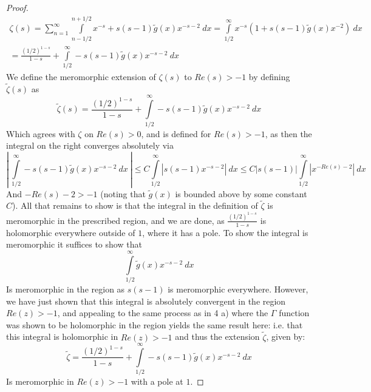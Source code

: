 \documentclass{article}
\begin{document}
\begin{proof}
    \begin{align*}
      \zeta(s) = \sum_{n=1}^{\infty}\int\limits_{n-1/2}^{n+1/2}x^{-s}+ s(s-1)\widetilde g(x) x^{-s-2} \ dx = \int\limits_{1/2}^{\infty}x^{-s}(1 + s(s-1)\widetilde g(x)x^{-2}) \ dx \\
      =  \frac{(1/2)^{1-s}}{1-s} + \int\limits_{1/2}^{\infty}-s(s-1)\widetilde g(x) x^{-s-2}\ dx
    \end{align*}
    We define the meromorphic extension of $\zeta(s)$ to $Re(s) > -1$ by defining $\widetilde \zeta(s)$ as
    \[
      \widetilde \zeta(s) = \frac{(1/2)^{1-s}}{1-s} + \int\limits_{1/2}^{\infty}-s(s-1)\widetilde g(x) x^{-s-2}\ dx
    \]
    Which agrees with $\zeta$ on $Re(s)> 0$, and is defined for $Re(s) > -1$, as then the integral on the right converges absolutely via
    \[
       \left| \ \int\limits_{1/2}^{\infty}-s(s-1)\widetilde g(x) x^{-s-2}\ dx \ \right| \leq   C \int\limits_{1/2}^{\infty}|s(s-1)x^{-s-2}|\ dx \leq C|s(s-1)|\int\limits_{1/2}^{\infty}|x^{-Re(s) - 2}|\ dx  
     \]
     And $- Re(s) - 2 > -1$ (noting that $\widetilde g(x)$ is bounded above by some constant $C$). All that remains to show is that the integral in the definition of $\widetilde\zeta$ is meromorphic in the prescribed region, and we are done, as $\frac{(1/2)^{1-s}}{1-s}$ is holomorphic everywhere outside of $1$, where it has a pole. To show the integral is meromorphic it suffices to show that
     \[
        \int\limits_{1/2}^{\infty}\widetilde g(x) x^{-s-2}\ dx
      \]
      Is meromorphic in the region as $s(s-1)$ is meromorphic everywhere. However, we have just shown that this integral is absolutely convergent in the region $Re(z) > -1$, and appealing to the same process as in 4 a) where the $\Gamma$ function was shown to be holomorphic in the region yields the same result here: i.e. that this integral is holomorphic in $Re(z) > -1$ and thus the extension $\widetilde \zeta$, given by:
      \[
          \widetilde \zeta =  \frac{(1/2)^{1-s}}{1-s} + \int\limits_{1/2}^{\infty}-s(s-1)\widetilde g(x) x^{-s-2}\ dx
        \]
        Is meromorphic in $Re(z) > -1$ with a pole at $1$. 
  \end{proof}
\end{document}
